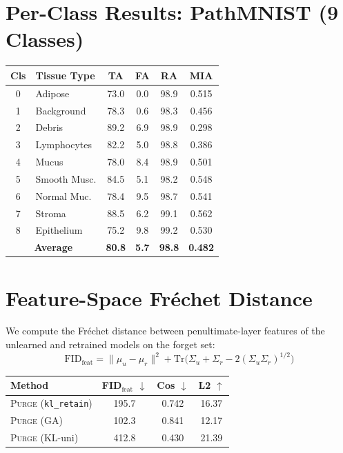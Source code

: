 \documentclass[letterpaper]{article}
\newcommand{\ours}{\textsc{Purge}}
\newcommand{\klr}{\texttt{kl\_retain}}
\begin{document}
\section{Per-Class Results: PathMNIST (9 Classes)}

\begin{center}
\small
\begin{tabular}{clcccc}
\toprule
Cls & Tissue Type & TA & FA & RA & MIA \\
\midrule
0 & Adipose & 73.0 & 0.0 & 98.9 & 0.515 \\
1 & Background & 78.3 & 0.6 & 98.3 & 0.456 \\
2 & Debris & 89.2 & 6.9 & 98.9 & 0.298 \\
3 & Lymphocytes & 82.2 & 5.0 & 98.8 & 0.386 \\
4 & Mucus & 78.0 & 8.4 & 98.9 & 0.501 \\
5 & Smooth Musc. & 84.5 & 5.1 & 98.2 & 0.548 \\
6 & Normal Muc. & 78.4 & 9.5 & 98.7 & 0.541 \\
7 & Stroma & 88.5 & 6.2 & 99.1 & 0.562 \\
8 & Epithelium & 75.2 & 9.8 & 99.2 & 0.530 \\
\midrule
\multicolumn{2}{c}{\textbf{Average}} & \textbf{80.8} & \textbf{5.7} & \textbf{98.8} & \textbf{0.482} \\
\bottomrule
\end{tabular}
\end{center}

\section{Feature-Space Fr\'{e}chet Distance}

We compute the Fr\'{e}chet distance between penultimate-layer features of the unlearned and retrained models on the forget set:
\[
\text{FID}_{\text{feat}} = \|\mu_u - \mu_r\|^2 + \text{Tr}\Big(\Sigma_u + \Sigma_r - 2(\Sigma_u \Sigma_r)^{1/2}\Big)
\]

\begin{center}
\small
\begin{tabular}{lccc}
\toprule
Method & FID$_{\text{feat}}$ $\downarrow$ & Cos $\downarrow$ & L2 $\uparrow$ \\
\midrule
\ours{} (\klr{}) & 195.7 & 0.742 & 16.37 \\
\ours{} (GA) & 102.3 & 0.841 & 12.17 \\
\ours{} (KL-uni) & 412.8 & 0.430 & 21.39 \\
\bottomrule
\end{tabular}
\end{center}
\end{document}
